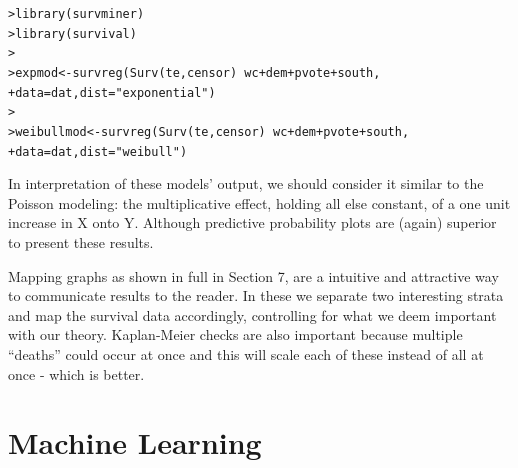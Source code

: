\documentclass[12pt]{article}\usepackage[]{graphicx}\usepackage[]{color}
\makeatletter
\newcommand{\hlstr}[1]{\textcolor[rgb]{0.82,0.78,0.62}{#1}}%
\newcommand{\hlopt}[1]{\textcolor[rgb]{0.882,0.878,0.898}{#1}}%
\newcommand{\hlstd}[1]{\textcolor[rgb]{0.882,0.878,0.898}{#1}}%
\newcommand{\hlkwb}[1]{\textcolor[rgb]{0.902,0.675,0.196}{#1}}%
\newcommand{\hlkwc}[1]{\textcolor[rgb]{0.812,0.522,0.388}{#1}}%
\newcommand{\hlkwd}[1]{\textcolor[rgb]{0.733,0.388,0.812}{#1}}%
\newenvironment{kframe}{%
 \def\at@end@of@kframe{}%
 \ifinner\ifhmode%
  \def\at@end@of@kframe{\end{minipage}}%
  \begin{minipage}{\columnwidth}%
 \fi\fi%
 \def\FrameCommand##1{\hskip\@totalleftmargin \hskip-\fboxsep
 \colorbox{shadecolor}{##1}\hskip-\fboxsep
     \hskip-\linewidth \hskip-\@totalleftmargin \hskip\columnwidth}%
 \MakeFramed {\advance\hsize-\width
   \@totalleftmargin\z@ \linewidth\hsize
   \@setminipage}}%
 {\par\unskip\endMakeFramed%
 \at@end@of@kframe}
\newenvironment{knitrout}{}{} %
\makeatother
\begin{document}
\begin{flushleft}
\begin{knitrout}
\color{fgcolor}\begin{kframe}
\begin{alltt}
\hlstd{> }\hlkwd{library}\hlstd{(survminer)}
\hlstd{> }\hlkwd{library}\hlstd{(survival)}
\hlstd{> }
\hlstd{> }\hlstd{expmod} \hlkwb{<-} \hlkwd{survreg}\hlstd{(}\hlkwd{Surv}\hlstd{(te, censor)} \hlopt{~} \hlstd{wc} \hlopt{+} \hlstd{dem} \hlopt{+} \hlstd{pvote} \hlopt{+} \hlstd{south,}
\hlstd{+ }                  \hlkwc{data} \hlstd{= dat,} \hlkwc{dist} \hlstd{=} \hlstr{"exponential"}\hlstd{)}
\hlstd{> }
\hlstd{> }\hlstd{weibullmod} \hlkwb{<-} \hlkwd{survreg}\hlstd{(}\hlkwd{Surv}\hlstd{(te, censor)} \hlopt{~} \hlstd{wc} \hlopt{+} \hlstd{dem} \hlopt{+} \hlstd{pvote} \hlopt{+} \hlstd{south,}
\hlstd{+ }                  \hlkwc{data} \hlstd{= dat,} \hlkwc{dist} \hlstd{=} \hlstr{"weibull"}\hlstd{)}
\end{alltt}
\end{kframe}
\end{knitrout}



In interpretation of these models' output, we should consider it similar to the Poisson modeling: the multiplicative effect, holding all else constant, of a one unit increase in X onto Y. Although predictive probability plots are (again) superior to present these results.

Mapping graphs as shown in full in Section 7, are a intuitive and attractive way to communicate results to the reader. In these we separate two interesting strata and map the survival data accordingly, controlling for what we deem important with our theory. Kaplan-Meier  checks are also important because multiple ``deaths'' could occur at once and this will scale each of these instead of all at once - which is better.









\clearpage
\section{Machine Learning}


\end{flushleft}
\end{document}
